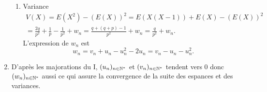 \begin{enumerate}
\begin{enumerate}
    
    \item Variance
\begin{multline*}
  V(X) = E(X^2)- (E(X))^2 = E(X(X-1)) + E(X) - (E(X))^2 \\
  = \frac{2q}{p^2} + \frac{1}{p} - \frac{1}{p^2} + w_n
  = \frac{q + (q + p) - 1}{p^2} + w_n 
  = \frac{q}{p^2} + w_n.
\end{multline*}
L'expression de $w_n$ est
\[
  w_n = v_n + u_n -u_n^2 - 2u_n = v_n - u_n - u_n^2.
\]
  \end{enumerate}

  \item D'après les majorations du I, $(u_n)_{n\in \mathbb{N}^*}$ et $(v_n)_{n\in \mathbb{N}^*}$ tendent vers $0$ donc $(w_n)_{n\in \mathbb{N}^*}$ aussi ce qui assure la convergence de la suite des espances et des variances.
\end{enumerate}

